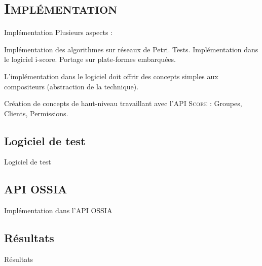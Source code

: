 

\section{\scshape Implémentation}
\begin{frame}{Implémentation}
	Plusieurs aspects : 
	
	\begin{itemize}
		\itemar Implémentation des algorithmes sur réseaux de Petri.
		\itemar Tests.
		\itemar Implémentation dans le logiciel i-score.
		\itemar Portage sur plate-formes embarquées.
	\end{itemize}
	
	L'implémentation dans le logiciel doit offrir des concepts simples aux compositeurs (abstraction de la technique).
	
	\begin{itemize}
		\itemar Création de concepts de haut-niveau travaillant avec l'\textsc{API Score} : Groupes, Clients, Permissions.
	\end{itemize}
\end{frame}

\subsection{Logiciel de test}
\begin{frame}{Logiciel de test}
	
\end{frame}

\subsection{API OSSIA}
\begin{frame}{Implémentation dans l'API OSSIA}
\end{frame}

\subsection{Résultats}
\begin{frame}{Résultats}

\end{frame}

